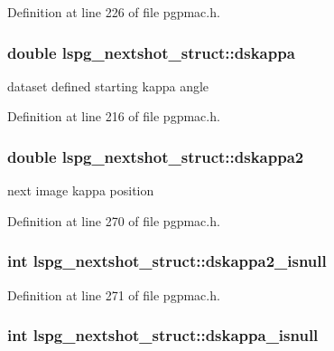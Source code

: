 Definition at line 226 of file pgpmac.\-h.

\hypertarget{structlspg__nextshot__struct_a59355281e8eb935cd7bfac597fdc5289}{
\subsubsection[{dskappa}]{\setlength{\rightskip}{0pt plus 5cm}double lspg\-\_\-nextshot\-\_\-struct\-::dskappa}}\label{structlspg__nextshot__struct_a59355281e8eb935cd7bfac597fdc5289}


dataset defined starting kappa angle 



Definition at line 216 of file pgpmac.\-h.

\hypertarget{structlspg__nextshot__struct_a8571a0b95fb6ea6356fd7204b9c9e371}{
\subsubsection[{dskappa2}]{\setlength{\rightskip}{0pt plus 5cm}double lspg\-\_\-nextshot\-\_\-struct\-::dskappa2}}\label{structlspg__nextshot__struct_a8571a0b95fb6ea6356fd7204b9c9e371}


next image kappa position 



Definition at line 270 of file pgpmac.\-h.

\hypertarget{structlspg__nextshot__struct_a9a7e47372f4f6e0e48a0cb3c78fa8437}{
\subsubsection[{dskappa2\-\_\-isnull}]{\setlength{\rightskip}{0pt plus 5cm}int lspg\-\_\-nextshot\-\_\-struct\-::dskappa2\-\_\-isnull}}\label{structlspg__nextshot__struct_a9a7e47372f4f6e0e48a0cb3c78fa8437}


Definition at line 271 of file pgpmac.\-h.

\hypertarget{structlspg__nextshot__struct_a1686a72509cc1c3383ee95a790ddff14}{
\subsubsection[{dskappa\-\_\-isnull}]{\setlength{\rightskip}{0pt plus 5cm}int lspg\-\_\-nextshot\-\_\-struct\-::dskappa\-\_\-isnull}}\label{structlspg__nextshot__struct_a1686a72509cc1c3383ee95a790ddff14}



